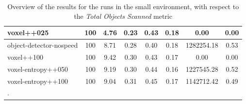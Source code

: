 \begin{table}
\begin{longtable}{|l|c|c| c|c| c|c|c|}
voxel++025 & 100 & {\cellcolor[HTML]{A0CEC5}} \color[HTML]{000000} 4.76 & {\cellcolor[HTML]{99CBC0}} \color[HTML]{000000} 0.23 & {\cellcolor[HTML]{B9DAD3}} \color[HTML]{000000} 0.43 & 0.18 & 0.00 & 0.00 \\ \hline
object-detector-nospeed & 100 & {\cellcolor[HTML]{60AFA0}} \color[HTML]{F1F1F1} 8.71 & {\cellcolor[HTML]{6FB6A8}} \color[HTML]{F1F1F1} 0.28 & {\cellcolor[HTML]{BEDCD6}} \color[HTML]{000000} 0.40 & 0.18 & 1282254.18 & 0.53 \\ \hline
voxel++100 & 100 & {\cellcolor[HTML]{55AA99}} \color[HTML]{F1F1F1} 9.42 & {\cellcolor[HTML]{5DAE9D}} \color[HTML]{F1F1F1} 0.30 & {\cellcolor[HTML]{B9DAD3}} \color[HTML]{000000} 0.43 & 0.17 & 0.00 & 0.00 \\ \hline
voxel-entropy++050 & 100 & {\cellcolor[HTML]{59AC9B}} \color[HTML]{F1F1F1} 9.19 & {\cellcolor[HTML]{59AC9B}} \color[HTML]{F1F1F1} 0.30 & {\cellcolor[HTML]{B7D9D2}} \color[HTML]{000000} 0.44 & 0.16 & 1227545.28 & 0.52 \\ \hline
voxel-entropy++100 & 100 & {\cellcolor[HTML]{5BAD9C}} \color[HTML]{F1F1F1} 9.04 & {\cellcolor[HTML]{55AA99}} \color[HTML]{F1F1F1} 0.31 & {\cellcolor[HTML]{B4D8D0}} \color[HTML]{000000} 0.45 & 0.17 & 1142712.42 & 0.49 \\ \hline
    
    \caption{Overview of the results for the runs in the small environment, with respect to the \textit{Total Objects Scanned} metric}.
    \label{tab:results-small-env-voxel}
\end{longtable}





\end{table}


\newpage


